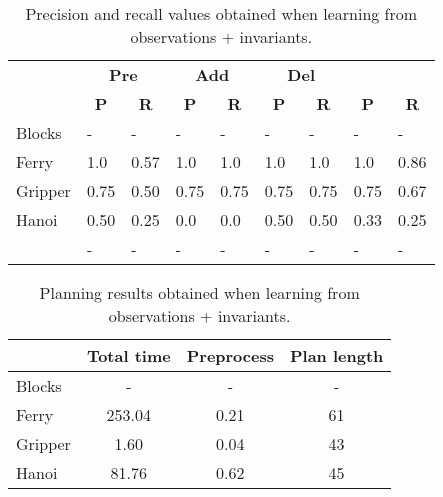 \documentclass{article}
\begin{document}
\begin{table}
	\begin{footnotesize}
		\begin{center}
			\begin{tabular}{l|l|l|l|l|l|l||l|l|}
				& \multicolumn{2}{|c|}{\bf Pre} & \multicolumn{2}{|c|}{\bf Add} & \multicolumn{2}{|c||}{\bf Del} & \multicolumn{2}{|c}{\bf}\\ \cline{2-9}			
				& \multicolumn{1}{|c|}{\bf P} & \multicolumn{1}{|c|}{\bf R} & \multicolumn{1}{|c|}{\bf P} & \multicolumn{1}{|c|}{\bf R} & \multicolumn{1}{|c|}{\bf P} & \multicolumn{1}{|c||}{\bf R} &  \multicolumn{1}{|c|}{\bf P} & \multicolumn{1}{|c|}{\bf R} \\
				\hline
				Blocks & - & - & - & - & - & - & - & - \\ %
				Ferry & 1.0 & 0.57 & 1.0 & 1.0 & 1.0 & 1.0 & 1.0 & 0.86 \\
				Gripper & 0.75 & 0.50 & 0.75 & 0.75 & 0.75 & 0.75 & 0.75 & 0.67 \\
				Hanoi & 0.50 & 0.25 & 0.0 & 0.0 & 0.50 & 0.50 & 0.33 & 0.25 \\
				\hline
				\bf & - & - & - & - & - & - & - & - \\
			\end{tabular}
		\end{center}
	\end{footnotesize}

  \caption{\small Precision and recall values obtained when learning from observations + invariants.}
\label{fig:observations2}
\end{table}

\begin{table}
	\begin{footnotesize}
		\begin{center}
			\begin{tabular}{l|c|c|c|}			
				& Total time & Preprocess & Plan length  \\
				\hline
				Blocks & - & - & -  \\ %
				Ferry & 253.04 & 0.21 & 61 \\
				Gripper & 1.60 & 0.04 & 43 \\
				Hanoi & 81.76 & 0.62 & 45  \\
			\end{tabular}
		\end{center}
	\end{footnotesize}
 \caption{\small Planning results obtained when learning from observations + invariants.}
\label{fig:planobservations2}		
\end{table}
\end{document}
